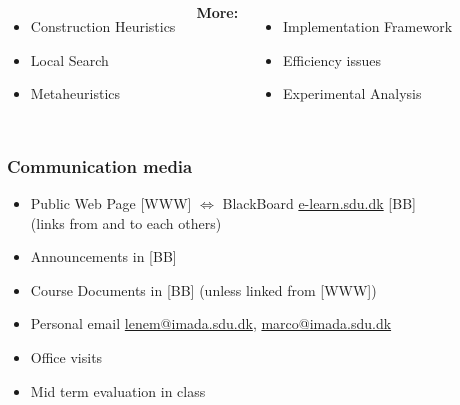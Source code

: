 \documentclass[handout,usepdftitle=false,aspectratio=169,smaller,compress,sans,fleqn,xcolor=dvipsnames,fleqn,table]{beamer}
\begin{document}
\begin{frame}
\begin{columns}[T,onlytextwidth]
  
\begin{itemize}
\item Construction Heuristics
\item Local Search
\item Metaheuristics
\end{itemize}

\medskip

\textbf{More:}
\begin{itemize}
  \itemsep=1ex
\item Implementation Framework
\item Efficiency issues
\item Experimental Analysis
  \end{itemize}

\end{columns}

\end{frame}










  \begin{frame}%
    \frametitle{Communication media}
    \medskip\begin{itemize}\itemsep=3ex
    
\item Public Web Page [WWW] $\Leftrightarrow$ BlackBoard \url{e-learn.sdu.dk} [BB]\\
 (links from and to each others)
\item \alert{Announcements} in [BB]
\item \alert{Course Documents} in [BB] (unless linked from [WWW]) 
\item Personal email \url{lenem@imada.sdu.dk}, \url{marco@imada.sdu.dk}
\item Office visits

\item \alert{Mid term evaluation} in class
\end{itemize}

\end{frame}
\end{document}
